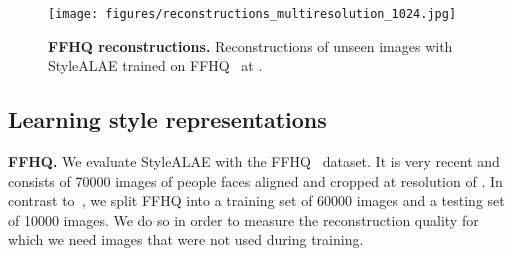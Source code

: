 \begin{figure*}[t!]
\begin{center}
\texttt{[image: figures/reconstructions\_multiresolution\_1024.jpg]}
\end{center}
\vspace{-5mm}
   \caption{\textbf{FFHQ reconstructions.} Reconstructions of unseen images with StyleALAE trained on FFHQ~\cite{Karras2019} at .}
\label{fig:recffhq}
\vspace{-4mm}
\end{figure*}
\begin{table}[t!]
\centering
{}
\caption{\textbf{FID scores.} FID scores (lower is better) measured on FFHQ~\cite{Karras2019} and LSUN Bedroom~\cite{yu2015lsun}.
}
\label{tab:fid}
\vspace{-4mm}
\end{table}
\subsection{Learning style representations}

\textbf{FFHQ.} We evaluate StyleALAE with the FFHQ~\cite{Karras2019} dataset. It is very recent and consists of 70000 images of people faces aligned and cropped at resolution of . In contrast to~\cite{Karras2019}, we split FFHQ into a training set of 60000 images and a testing set of 10000 images. We do so in order to measure the reconstruction quality for which we need images that were not used during training.

